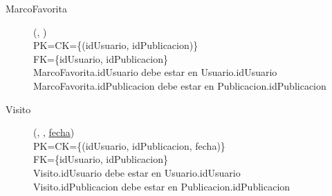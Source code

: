 \begin{description}
  \item[MarcoFavorita](\underline{}, \underline{})\\
PK=CK=\{(idUsuario, idPublicacion)\}\\
FK=\{idUsuario, idPublicacion\}\\
MarcoFavorita.idUsuario debe estar en Usuario.idUsuario\\
MarcoFavorita.idPublicacion debe estar en Publicacion.idPublicacion

  \item[Visito](\underline{}, \underline{}, \underline{fecha})\\
PK=CK=\{(idUsuario, idPublicacion, fecha)\}\\
FK=\{idUsuario, idPublicacion\}\\
Visito.idUsuario debe estar en Usuario.idUsuario\\
Visito.idPublicacion debe estar en Publicacion.idPublicacion

\end{description}

\newpage
